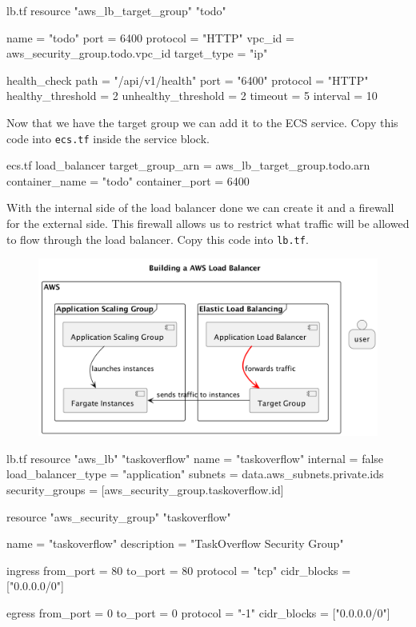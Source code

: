 \documentclass{csse4400}
\begin{document}
\begin{code}[language=terraform,numbers=none,keepspaces=true]{lb.tf}
resource "aws_lb_target_group" "todo" {
  name          = "todo"
  port          = 6400
  protocol      = "HTTP"
  vpc_id        = aws_security_group.todo.vpc_id
  target_type   = "ip"

  health_check {
    path                = "/api/v1/health"
    port                = "6400"
    protocol            = "HTTP"
    healthy_threshold   = 2
    unhealthy_threshold = 2
    timeout             = 5
    interval            = 10
  }
}
\end{code}

Now that we have the target group we can add it to the ECS service. Copy this code into \texttt{ecs.tf} inside the service block.

\begin{code}[language=terraform,numbers=none,keepspaces=true]{ecs.tf}
  load_balancer {
    target_group_arn = aws_lb_target_group.todo.arn
    container_name   = "todo"
    container_port   = 6400
  }
\end{code}

With the internal side of the load balancer done we can create it and a firewall for the external side. This firewall allows us to restrict what traffic will be allowed to flow through the load balancer. Copy this code into \texttt{lb.tf}.

\begin{figure}[H]
  \begin{center}
    \includegraphics[scale=0.2]{diagrams/lb3fargate}
  \end{center}
\end{figure}

\begin{code}[language=terraform,numbers=none,keepspaces=true]{lb.tf}
resource "aws_lb" "taskoverflow" {
  name               = "taskoverflow"
  internal           = false
  load_balancer_type = "application"
  subnets            = data.aws_subnets.private.ids
  security_groups    = [aws_security_group.taskoverflow.id]
}

resource "aws_security_group" "taskoverflow" {
  name        = "taskoverflow"
  description = "TaskOverflow Security Group"

  ingress {
    from_port     = 80
    to_port       = 80
    protocol      = "tcp"
    cidr_blocks   = ["0.0.0.0/0"]
  }

  egress {
    from_port     = 0
    to_port       = 0
    protocol      = "-1"
    cidr_blocks   = ["0.0.0.0/0"]
  }
}
\end{code}
\end{document}
